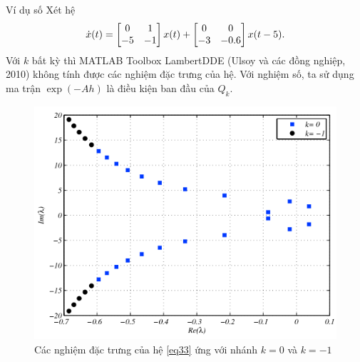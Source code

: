 \documentclass[10pt]{beamer}
\begin{document}
	\small{
	\begin{frame}{Ví dụ số}
		Xét hệ 
		\begin{equation}\label{eq33}
			\dot{x}(t) = \begin{bmatrix} 0 & 1\\ -5 &-1 \end{bmatrix}x(t) + \begin{bmatrix} 	0 & 0\\ -3 &-0.6 \end{bmatrix}x(t - 5).
		\end{equation}
		Với $k$ bất kỳ thì MATLAB Toolbox LambertDDE (Ulsoy và các đồng nghiệp, 2010) không tính được các nghiệm đặc trưng của hệ. 
		Với nghiệm số, ta sử dụng ma trận $\exp (-Ah )$ là điều kiện ban đầu của $Q_k$. 
		
		\begin{figure}[h!]
			\centering
			\includegraphics[scale= 0.4]{"./Hinh/Hinh 2"}
			\caption{ Các nghiệm đặc trưng của hệ \eqref{eq33} ứng với nhánh $k=0$  và $k = -1$  }
			\label{fig:hinh-2}
		\end{figure}
	\end{frame}
}
\end{document}
